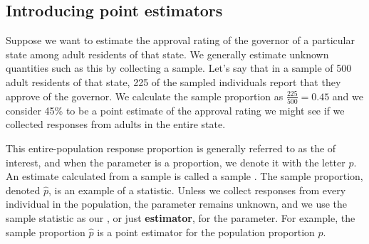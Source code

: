 
\subsection{Introducing point estimators}



Suppose we want to estimate the approval rating of the governor of a particular state among adult residents of that state.  We generally estimate unknown quantities such as this by collecting a sample.  Let's say that in a sample of 500 adult residents of that state,  225 of the sampled individuals report that they approve of the governor.  We calculate the sample proportion as $\frac{225}{500} = 0.45$ and  we consider 45\% to be a
point estimate of the approval rating we might see if we collected responses from adults in the
entire state.  

This entire-population response proportion is
generally referred to as the 
of interest,
and when the parameter is a proportion,
we denote it with the letter $p$.   An estimate calculated from a sample is called a sample .  The sample proportion, denoted $\hat{p}$, is an example of a statistic.  Unless we collect responses from every individual in the population, the parameter remains unknown, and we use the sample statistic as our , or just \textbf{estimator}, for the parameter.  For example, the sample proportion $\hat{p}$ is a point estimator for the population proportion $p$.  

